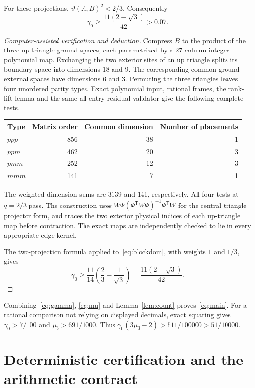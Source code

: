 \documentclass[11pt,a4paper]{article}
\theoremstyle{remark}\newtheorem{remark}[theorem]{Remark}
\begin{document}
\begin{proposition}\label{prop:blockangle}
For these projections, $\vartheta(A,B)^2<2/3$. Consequently
\begin{equation}\label{eq:gamma}
 \gamma_0\ge\frac{11(2-\sqrt3)}{42}>0.07.
\end{equation}
\end{proposition}
\begin{proof}[Computer-assisted verification and deduction]
Compress $B$ to the product of the three up-triangle ground spaces, each parametrized by a 27-column integer polynomial map. Exchanging the two exterior sites of an up triangle splits its boundary space into dimensions 18 and 9. The corresponding common-ground external spaces have dimensions 6 and 3. Permuting the three triangles leaves four unordered parity types. Exact polynomial input, rational frames, the rank-lift lemma and the same all-entry residual validator give the following complete tests.
\begin{center}
\begin{tabular}{lrrr}\toprule
Type&Matrix order&Common dimension&Number of placements\\\midrule
$ppp$&856&38&1\\$ppm$&462&20&3\\$pmm$&252&12&3\\$mmm$&141&7&1\\\bottomrule
\end{tabular}
\end{center}
The weighted dimension sums are 3139 and 141, respectively. All four tests at $q=2/3$ pass. The construction uses $W\Psi(\Psi^{\mathsf T}W\Psi)^{-1}\Psi^{\mathsf T}W$ for the central triangle projector form, and traces the two exterior physical indices of each up-triangle map before contraction. The exact maps are independently checked to lie in every appropriate edge kernel.

The two-projection formula applied to~\eqref{eq:blockdom}, with weights $1$ and $1/3$, gives
\[
 \gamma_0\ge\frac{11}{14}\left(\frac23-\frac1{\sqrt3}\right)
 =\frac{11(2-\sqrt3)}{42}.
\]
\end{proof}
Combining~\eqref{eq:gamma}, \eqref{eq:mu} and Lemma~\ref{lem:count} proves~\eqref{eq:main}. For a rational comparison not relying on displayed decimals, exact squaring gives $\gamma_0>7/100$ and $\mu_3>691/1000$. Thus $\gamma_0(3\mu_3-2)>511/100000>51/10000$.

\section{Deterministic certification and the arithmetic contract}\label{sec:certificate}
\end{document}
